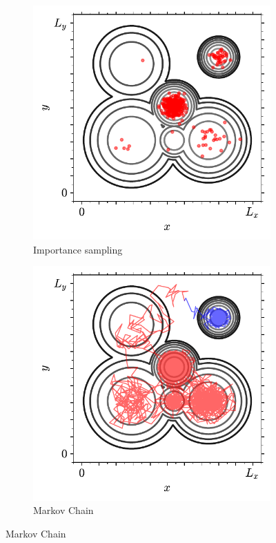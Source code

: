\begin{figure}[btp]
     \vspace{0.5cm}
     \begin{subfigure}[b]{0.48\textwidth}
         \centering
         \includegraphics[width=\textwidth]{./figures/methods/mc_2d_imp.pdf}
         \caption{Importance sampling}
         \label{fig:montecarloint3}
     \end{subfigure}
     \hfill
     \begin{subfigure}[b]{0.48\textwidth}
         \centering
         \includegraphics[width=\textwidth]{./figures/methods/mc_2d_mcmc.pdf}
         \caption{Markov Chain \mc}
         \label{fig:montecarloint4}
     \end{subfigure}
     \hfill
    

\end{figure}
